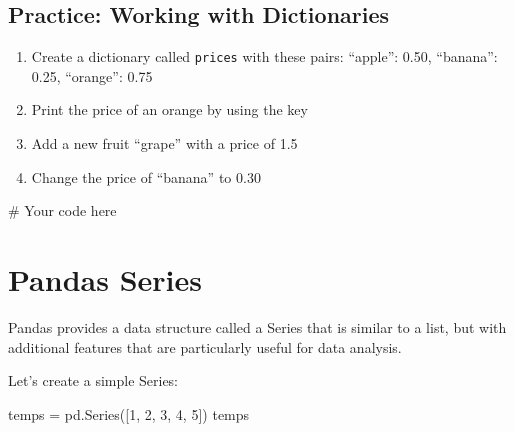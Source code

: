 \documentclass[
  letterpaper,
  DIV=11,
  numbers=noendperiod]{scrreprt}
\newenvironment{Shaded}{\begin{snugshade}}{\end{snugshade}}
\newcommand{\CommentTok}[1]{\textcolor[rgb]{0.37,0.37,0.37}{#1}}
\newcommand{\DecValTok}[1]{\textcolor[rgb]{0.68,0.00,0.00}{#1}}
\newcommand{\NormalTok}[1]{\textcolor[rgb]{0.00,0.23,0.31}{#1}}
\newcommand{\OperatorTok}[1]{\textcolor[rgb]{0.37,0.37,0.37}{#1}}
\providecommand{\tightlist}{%
  \setlength{\itemsep}{0pt}\setlength{\parskip}{0pt}}\usepackage{longtable,booktabs,array}
\begin{document}
\begin{tcolorbox}[enhanced jigsaw, colframe=quarto-callout-tip-color-frame, opacityback=0, titlerule=0mm, bottomrule=.15mm, breakable, leftrule=.75mm, colbacktitle=quarto-callout-tip-color!10!white, title=\textcolor{quarto-callout-tip-color}{\faLightbulb}\hspace{0.5em}{Practice}, rightrule=.15mm, coltitle=black, opacitybacktitle=0.6, colback=white, left=2mm, arc=.35mm, toptitle=1mm, bottomtitle=1mm, toprule=.15mm]

\subsection{Practice: Working with
Dictionaries}\label{practice-working-with-dictionaries}

\begin{enumerate}
\def\labelenumi{\arabic{enumi}.}
\tightlist
\item
  Create a dictionary called \texttt{prices} with these pairs:
  ``apple'': 0.50, ``banana'': 0.25, ``orange'': 0.75
\item
  Print the price of an orange by using the key
\item
  Add a new fruit ``grape'' with a price of 1.5
\item
  Change the price of ``banana'' to 0.30
\end{enumerate}

\begin{Shaded}
\begin{Highlighting}[]
\CommentTok{\# Your code here}
\end{Highlighting}
\end{Shaded}

\end{tcolorbox}

\section{Pandas Series}\label{pandas-series}

Pandas provides a data structure called a Series that is similar to a
list, but with additional features that are particularly useful for data
analysis.

Let's create a simple Series:

\begin{Shaded}
\begin{Highlighting}[]
\NormalTok{temps }\OperatorTok{=}\NormalTok{ pd.Series([}\DecValTok{1}\NormalTok{, }\DecValTok{2}\NormalTok{, }\DecValTok{3}\NormalTok{, }\DecValTok{4}\NormalTok{, }\DecValTok{5}\NormalTok{])}
\NormalTok{temps}
\end{Highlighting}
\end{Shaded}
\end{document}
